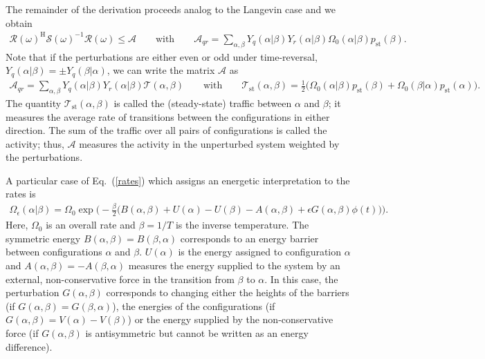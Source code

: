 \documentclass[aps,pre,twocolumn,superscriptaddress,notitlepage]{revtex4-2}
\newcommand{\bmc}[1]{\bm{\mathcal{#1}}}
\renewcommand{\eqref}[1]{Eq.~(\ref{#1})}
\begin{document}
The remainder of the derivation proceeds analog to the Langevin case and we obtain
\begin{align}
\bmc{R}(\omega)^\text{H} \bmc{S}(\omega)^{-1} \bmc{R}(\omega) \leq \bmc{A} \qquad \text{with} \qquad \mathcal{A}_{qr} = \sum_{\alpha,\beta} Y_q(\alpha \vert \beta) Y_r(\alpha \vert \beta) \Omega_0(\alpha \vert \beta) p_\text{st}(\beta) . \label{fffri-jump}
\end{align}
Note that if the perturbations are either even or odd under time-reversal, $Y_q(\alpha \vert \beta) = \pm Y_q(\beta \vert \alpha)$, we can write the matrix $\bmc{A}$ as
\begin{align}
\mathcal{A}_{qr} = \sum_{\alpha,\beta} Y_q(\alpha \vert \beta) Y_r(\alpha \vert \beta) \mathcal{T}(\alpha, \beta)  \qquad \text{with} \qquad \mathcal{T}_\text{st}(\alpha, \beta) = \frac{1}{2} \big( \Omega_0(\alpha \vert \beta) p_\text{st}(\beta) + \Omega_0(\beta \vert \alpha) p_\text{st}(\alpha) \big) .
\end{align}
The quantity $\mathcal{T}_\text{st}(\alpha, \beta)$ is called the (steady-state) traffic between $\alpha$ and $\beta$; it measures the average rate of transitions between the configurations in either direction.
The sum of the traffic over all pairs of configurations is called the activity; thus, $\bmc{A}$ measures the activity in the unperturbed system weighted by the perturbations.

A particular case of \eqref{rates} which assigns an energetic interpretation to the rates is
\begin{align}
\Omega_\epsilon(\alpha \vert \beta) = \Omega_0 \exp \bigg( - \frac{\beta}{2} \Big( B(\alpha,\beta) + U(\alpha) - U(\beta) - A(\alpha,\beta) + \epsilon G(\alpha,\beta) \phi(t) \Big) \bigg) .
\end{align}
Here, $\Omega_0$ is an overall rate and $\beta = 1/T$ is the inverse temperature.
The symmetric energy $B(\alpha,\beta) = B(\beta,\alpha)$ corresponds to an energy barrier between configurations $\alpha$ and $\beta$.
$U(\alpha)$ is the energy assigned to configuration $\alpha$ and $A(\alpha,\beta) = -A(\beta,\alpha)$ measures the energy supplied to the system by an external, non-conservative force in the transition from $\beta$ to $\alpha$.
In this case, the perturbation $G(\alpha,\beta)$ corresponds to changing either the heights of the barriers (if $G(\alpha,\beta) = G(\beta,\alpha)$), the energies of the configurations (if $G(\alpha,\beta) = V(\alpha) - V(\beta)$) or the energy supplied by the non-conservative force (if $G(\alpha,\beta)$ is antisymmetric but cannot be written as an energy difference).
\end{document}
